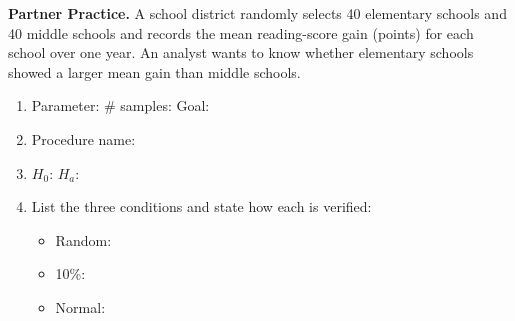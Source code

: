 \documentclass[10pt]{article}
\begin{document}
\begin{practicebox}
\textbf{Partner Practice.} \;
A school district randomly selects 40 elementary schools and 40 middle schools and records
the mean reading-score gain (points) for each school over one year. An analyst wants to know
whether elementary schools showed a larger mean gain than middle schools.

\begin{enumerate}
  \item Parameter: \blank{5cm} \quad \# samples: \blank{3cm} \quad Goal: \blank{3cm}
  \item Procedure name: \blank{9cm}
  \item $H_0$: \blank{5cm} \quad $H_a$: \blank{5cm}
  \item List the three conditions and state how each is verified:
        \begin{itemize}
          \item Random: \writeline
          \item 10\%: \writeline
          \item Normal: \writeline
        \end{itemize}
\end{enumerate}
\end{practicebox}
\end{document}
